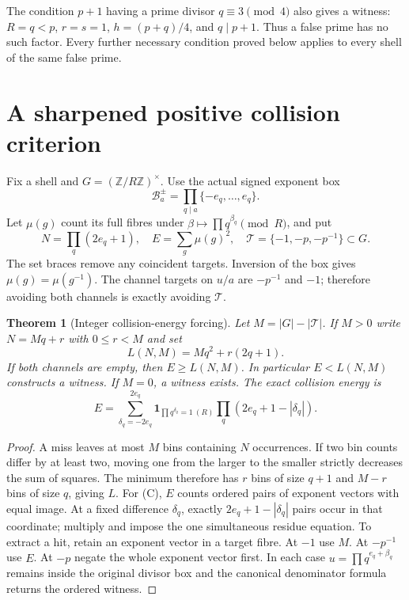 \documentclass[11pt]{article}
\newtheorem{theorem}{Theorem}[section]
\theoremstyle{definition}\newtheorem{definition}[theorem]{Definition}
\theoremstyle{remark}\newtheorem{remark}[theorem]{Remark}
\newcommand{\Z}{\mathbb Z}\newcommand{\Q}{\mathbb Q}\newcommand{\R}{\mathbb R}
\begin{document}
The condition $p+1$ having a prime divisor $q\equiv3\pmod4$ also gives a
witness: $R=q<p$, $r=s=1$, $h=(p+q)/4$, and $q\mid p+1$.
Thus a false prime has no such factor. Every further necessary condition
proved below applies to every shell of the same false prime.

\section{A sharpened positive collision criterion}
Fix a shell and $G=(\Z/R\Z)^\times$. Use the actual signed exponent box
\[
 \mathcal B^\pm_a=\prod_{q\mid a}\{-e_q,\ldots,e_q\}.
\]
Let $\mu(g)$ count its full fibres under
$\beta\mapsto\prod q^{\beta_q}\pmod R$, and put
\[
 N=\prod_q(2e_q+1),\quad E=\sum_g\mu(g)^2,
 \quad\mathcal T=\{-1,-p,-p^{-1}\}\subset G.
\]
The set braces remove any coincident targets. Inversion of the box gives
$\mu(g)=\mu(g^{-1})$. The channel targets on $u/a$ are $-p^{-1}$ and $-1$;
therefore avoiding both channels is exactly avoiding $\mathcal T$.

\begin{theorem}[Integer collision-energy forcing]\label{thm:energy}
Let $M=|G|-|\mathcal T|$. If $M>0$ write $N=Mq+r$ with $0\le r<M$ and set
\[
 L(N,M)=Mq^2+r(2q+1).
\]
If both channels are empty, then $E\ge L(N,M)$.
In particular $E<L(N,M)$ constructs a witness. If $M=0$, a witness exists.
The exact collision energy is
\[
 E=\sum_{\delta_q=-2e_q}^{2e_q}
 \mathbf1_{\prod q^{\delta_q}=1\ (R)}
 \prod_q(2e_q+1-|\delta_q|).\tag{C}
\]
\end{theorem}
\begin{proof}
A miss leaves at most $M$ bins containing $N$ occurrences. If two bin
counts differ by at least two, moving one from the larger to the smaller
strictly decreases the sum of squares. The minimum therefore has $r$
bins of size $q+1$ and $M-r$ bins of size $q$, giving $L$.
For (C), $E$ counts ordered pairs of exponent vectors with equal image.
At a fixed difference $\delta_q$, exactly $2e_q+1-|\delta_q|$ pairs
occur in that coordinate; multiply and impose the one simultaneous
residue equation. To extract a hit, retain an exponent vector in a target
fibre. At $-1$ use $M$. At $-p^{-1}$ use $E$. At $-p$ negate the whole
exponent vector first. In each case $u=\prod q^{e_q+\beta_q}$ remains
inside the original divisor box and the canonical denominator formula
returns the ordered witness.
\end{proof}
\end{document}
